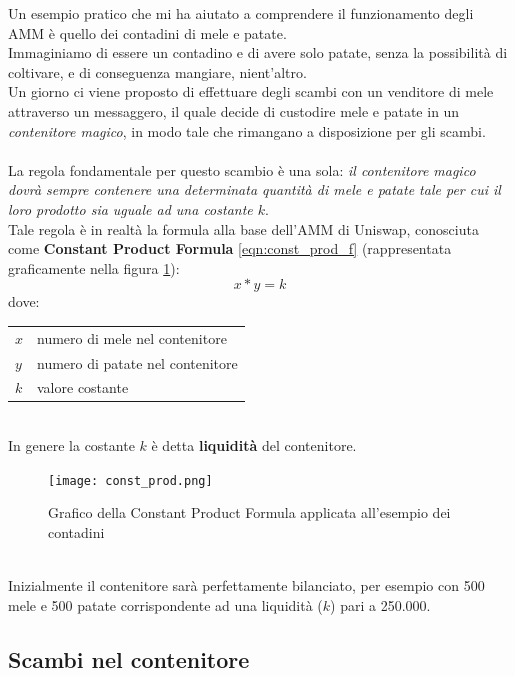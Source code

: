 \documentclass[12pt,a4paper]{report}
\makeatletter
\newenvironment{conditions}
  {\par\vspace{\abovedisplayskip}\noindent\begin{tabular}{>{$}l<{$} @{${}={}$} l}}
  {\end{tabular}\par\vspace{\belowdisplayskip}}
\makeatother
\begin{document}
Un esempio pratico che mi ha aiutato a comprendere il funzionamento degli AMM è quello dei contadini di mele e patate.
\\Immaginiamo di essere un contadino e di avere solo patate, senza la possibilità di coltivare, e di conseguenza mangiare, nient'altro.\\ Un giorno ci viene proposto di effettuare degli scambi con un venditore di mele attraverso un messaggero, il quale decide di custodire mele e patate in un \textit{contenitore magico}, in modo tale che rimangano a disposizione per gli scambi.
\\\\La regola fondamentale per questo scambio è una sola: \textit{il contenitore magico dovrà sempre contenere una determinata quantità di mele e patate tale per cui il loro prodotto sia uguale ad una costante $k$}.
\\Tale regola è in realtà la formula alla base dell'AMM di Uniswap, conosciuta come \textbf{Constant Product Formula} \ref{eqn:const_prod_f} (rappresentata graficamente nella figura \ref{fig:const_prod}): \\

\begin{equation}
x * y = k
\label{eqn:const_prod_f}
\end{equation}
dove:
\begin{conditions}
 x & numero di mele nel contenitore \\
 y & numero di patate nel contenitore \\  
 k & valore costante \\
\end{conditions}

\noindent \\In genere la costante $k$ è detta \textbf{liquidità} del contenitore.

\begin{figure}[H]
  \texttt{[image: const\_prod.png]}
  \centering
  \caption{Grafico della Constant Product Formula applicata all'esempio dei contadini}
  \label{fig:const_prod}
\end{figure}

\noindent\\Inizialmente il contenitore sarà perfettamente bilanciato, per esempio con 500 mele e 500 patate corrispondente ad una liquidità ($k$) pari a 250.000.

\subsection{Scambi nel contenitore}
\end{document}

